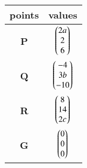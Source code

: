 \begin{tabular}{|c|c|}
\hline
\textbf{points} & \textbf{values}\\
\hline
\textbf{P} & $\begin{pmatrix}2a\\2\\6\end{pmatrix}$\\
\hline
\textbf{Q} & $\begin{pmatrix}-4\\3b\\-10\end{pmatrix}$\\
\hline
\textbf{R} & $\begin{pmatrix}8\\14\\2c\end{pmatrix}$\\
\hline
\textbf{G} & $\begin{pmatrix}0\\0\\0\end{pmatrix}$\\
\hline
\end{tabular}
